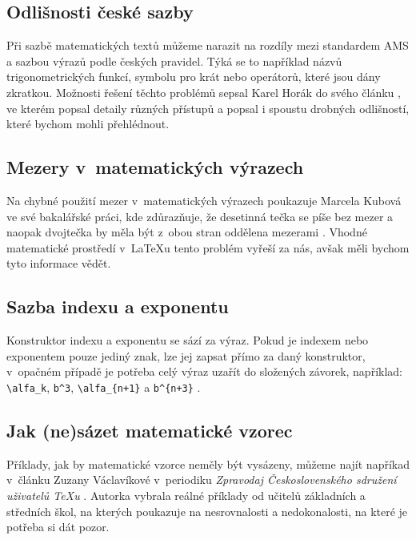 \documentclass[a4paper,11pt]{article}
\begin{document}
\subsection*{Odlišnosti české sazby}

Při sazbě matematických textů můžeme narazit na rozdíly mezi standardem AMS a sazbou výrazů podle českých pravidel. Týká se to například názvů trigonometrických funkcí, symbolu pro krát nebo operátorů, které jsou dány zkratkou. Možnosti řešení těchto problémů sepsal Karel Horák do svého článku \cite{Horak:Sazba_matematiky}, ve kterém popsal detaily různých přístupů a popsal i spoustu drobných odlišností, které bychom mohli přehlédnout.

\subsection*{Mezery v~matematických výrazech}

Na chybné použití mezer v~matematických výrazech poukazuje Marcela Kubová ve své bakalářské práci, kde zdůrazňuje, že desetinná tečka se píše bez mezer a naopak dvojtečka by měla být z~obou stran oddělena mezerami \cite{Kubova:Kontrola_typografie}. Vhodné matematické prostředí v~\LaTeX u tento problém vyřeší za nás, avšak měli bychom tyto informace vědět.  

\subsection*{Sazba indexu a exponentu}

Konstruktor indexu a exponentu se sází za výraz. Pokud je indexem nebo exponentem pouze jediný znak, lze jej zapsat přímo za daný konstruktor, v~opačném případě je potřeba celý výraz uzařít do složených závorek, například: \verb|\alfa_k|, \verb|b^3|, \verb|\alfa_{n+1}| a \verb|b^{n+3}| \cite{Olsak:Zpravodaj}.

\subsection*{Jak (ne)sázet matematické vzorec}

Příklady, jak by matematické vzorce neměly být vysázeny, můžeme najít napříkad v~článku Zuzany Václavíkové v~periodiku \emph{Zpravodaj Československého sdružení uživatelů \TeX u} \cite{Vaclavikova:Zpravodaj}. Autorka vybrala reálné příklady od učitelů základních a středních škol, na kterých poukazuje na nesrovnalosti a nedokonalosti, na které je potřeba si dát pozor.

\newpage

\renewcommand{\refname}{Použitá literatura}


\end{document}
